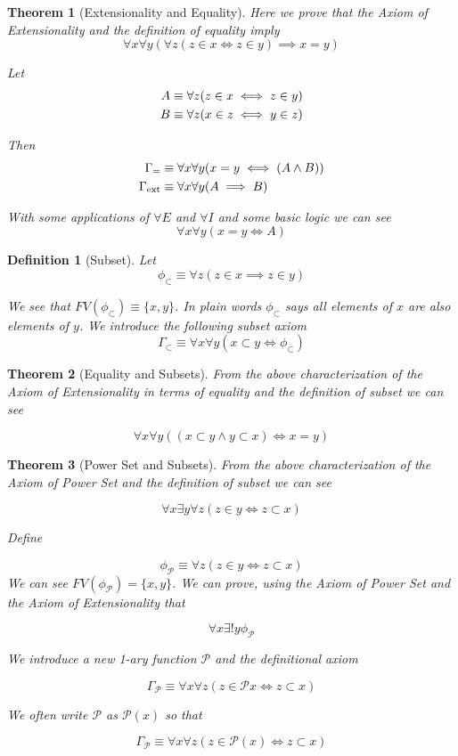 \documentclass[12pt]{article}
\theoremstyle{break}
\newtheorem{definition}{Definition}[section]
\theoremstyle{break}
\newtheorem{theorem}{Theorem}[section]
\theoremstyle{break}
\theoremstyle{break}
\theoremstyle{break}
\newtheorem{informal definition}[definition]{Informal Definition}
\begin{document}
\begin{theorem}[Extensionality and Equality]
Here we prove that the Axiom of Extensionality and the definition of equality imply
$$
\forall x \forall y \left(\forall z(z\in x \iff z \in y) \implies x=y\right)
$$

Let
\begin{align}
A &\equiv \forall z (z\in x \iff z \in y) \notag\\
B &\equiv \forall z (x\in z \iff y \in z) \notag
\end{align}

Then
\begin{align}
\Gamma_= &\equiv \forall x \forall y (x=y \iff (A\land B)) \notag\\
\Gamma_{\text{ext}} &\equiv \forall x \forall y (A \implies B)
\end{align}

With some applications of $\forall E$ and $\forall I$ and some basic logic we can see
$$
\forall x \forall y (x=y \iff A)
$$
\end{theorem}

\begin{definition}[Subset]
Let
$$
\phi_{\subset} \equiv \forall z \left(z\in x \implies z \in y\right)
$$

We see that $FV(\phi_{\subset}) \equiv \{x, y\}$.
In plain words $\phi_\subset$ says all elements of $x$ are also elements of $y$.
We introduce the following subset axiom
$$
\Gamma_{\subset} \equiv \forall x \forall y (x\subset y \iff \phi_{\subset})
$$
\end{definition}

\begin{theorem}[Equality and Subsets]
From the above characterization of the Axiom of Extensionality in terms of equality and the definition of subset we can see

$$
\forall x \forall y \left((x\subset y \land y \subset x) \iff x = y \right)
$$
\end{theorem}

\begin{theorem}[Power Set and Subsets]
From the above characterization of the Axiom of Power Set and the definition of subset we can see

$$
\forall x \exists y \forall z(z\in y \iff z\subset x)
$$

Define

$$
\phi_{\mathcal{P}} \equiv \forall z (z\in y \iff z \subset x)
$$
We can see $FV(\phi_{\mathcal{P}}) = \{x, y\}$.
We can prove, using the Axiom of Power Set and the Axiom of Extensionality that

$$
\forall x \exists! y \phi_{\mathcal{P}}
$$

We introduce a new 1-ary function $\mathcal{P}$ and the definitional axiom

$$
\Gamma_{\mathcal{P}} \equiv \forall x \forall z(z\in \mathcal{P}x \iff z \subset x)
$$

We often write $\mathcal{P}$ as $\mathcal{P}(x)$ so that

$$
\Gamma_{\mathcal{P}} \equiv \forall x \forall z (z\in \mathcal{P}(x) \iff z \subset x)
$$

\end{theorem}
\end{document}
